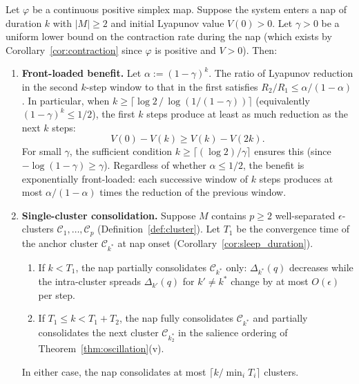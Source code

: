 \begin{theorem}
\label{thm:nap}
\leanok
{}
Let $\varphi$ be a continuous positive simplex map.  Suppose the system
enters a nap of duration $k$ with $|M| \geq 2$ and initial Lyapunov
value $V(0) > 0$.  Let $\gamma > 0$ be a uniform lower bound on the
contraction rate during the nap (which exists by
Corollary~\ref{cor:contraction} since $\varphi$ is
positive and $V > 0$).  Then:

\begin{enumerate}
\item \textbf{Front-loaded benefit.}  Let $\alpha := (1-\gamma)^k$.  The ratio of Lyapunov reduction in the second $k$-step window to that in the first satisfies $R_2/R_1 \leq \alpha/(1-\alpha)$.  In particular, when $k \geq \lceil\log 2\,/\,\log(1/(1-\gamma))\rceil$ (equivalently $(1-\gamma)^k \leq 1/2$), the first $k$ steps produce at least as much reduction as the next $k$ steps:
\[
V(0) - V(k) \geq V(k) - V(2k).
\]
For small $\gamma$, the sufficient condition $k \geq \lceil(\log 2)/\gamma\rceil$ ensures this (since $-\log(1-\gamma) \geq \gamma$).  Regardless of whether $\alpha \leq 1/2$, the benefit is exponentially front-loaded: each successive window of $k$ steps produces at most $\alpha/(1-\alpha)$ times the reduction of the previous window.

\item \textbf{Single-cluster consolidation.}  Suppose $M$ contains
$p \geq 2$ well-separated $\epsilon$-clusters
$\mathcal{C}_1, \ldots, \mathcal{C}_p$ (Definition~\ref{def:cluster}).
Let $T_1$ be the convergence time of the anchor cluster
$\mathcal{C}_{k^*}$ at nap onset (Corollary~\ref{cor:sleep_duration}).
\begin{enumerate}
\item If $k < T_1$, the nap partially consolidates
$\mathcal{C}_{k^*}$ only: $\Delta_{k^*}(q)$ decreases while the
intra-cluster spreads $\Delta_{k'}(q)$ for $k' \neq k^*$ change by at most $O(\epsilon)$ per step.
\item If $T_1 \leq k < T_1 + T_2$, the nap fully consolidates
$\mathcal{C}_{k^*}$ and partially consolidates the next cluster
$\mathcal{C}_{k^*_2}$ in the salience ordering of
Theorem~\ref{thm:oscillation}(v).
\end{enumerate}
In either case, the nap consolidates at most
$\lceil k / \min_i T_i \rceil$ clusters.


\end{enumerate}
\end{theorem}
